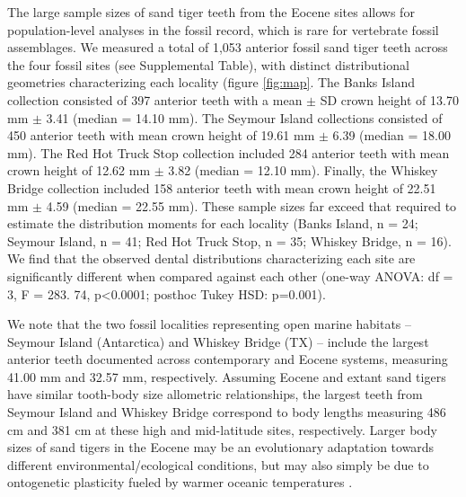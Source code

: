 \documentclass[]{rsos}%
\begin{document}
The large sample sizes of sand tiger teeth from the Eocene sites allows for population-level analyses in the fossil record, which is rare for vertebrate fossil assemblages.
We measured a total of 1,053 anterior fossil sand tiger teeth across the four fossil sites (see Supplemental Table), with distinct distributional geometries characterizing each locality (figure \ref{fig:map}.
The Banks Island collection consisted of 397 anterior teeth with a mean $\pm$ SD crown height of 13.70 mm $\pm$ 3.41 (median = 14.10 mm). 
The Seymour Island collections consisted of 450 anterior teeth with mean crown height of 19.61 mm $\pm$ 6.39 (median = 18.00 mm).
The Red Hot Truck Stop collection included 284 anterior teeth with mean crown height of 12.62 mm $\pm$ 3.82 (median = 12.10 mm).
Finally, the Whiskey Bridge collection included 158 anterior teeth with mean crown height of 22.51 mm $\pm$ 4.59 (median = 22.55 mm). 
These sample sizes far exceed that required to estimate the distribution moments for each locality (Banks Island, n = 24; Seymour Island, n = 41; Red Hot Truck Stop, n = 35; Whiskey Bridge, n = 16).
We find that the observed dental distributions characterizing each site are significantly different when compared against each other (one-way ANOVA: df = 3, F = 283. 74, p<0.0001; posthoc Tukey HSD: p=0.001). 

We note that the two fossil localities representing open marine habitats -- Seymour Island (Antarctica) and Whiskey Bridge (TX) -- include the largest anterior teeth documented across contemporary and Eocene systems, measuring 41.00 mm and 32.57 mm, respectively. 
Assuming Eocene and extant sand tigers have similar tooth-body size allometric relationships, the largest teeth from Seymour Island and Whiskey Bridge correspond to body lengths measuring 486 cm and 381 cm at these high and mid-latitude sites, respectively. %
Larger body sizes of sand tigers in the Eocene may be an evolutionary adaptation towards different environmental/ecological conditions, but may also simply be due to ontogenetic plasticity fueled by warmer oceanic temperatures \cite{Kim2020}. %
\end{document}
